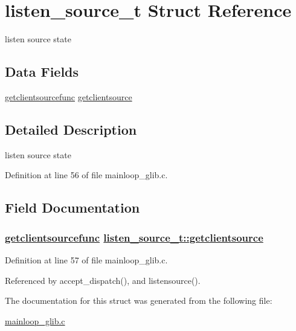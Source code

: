 \hypertarget{structlisten__source__t}{
\section{listen\_\-source\_\-t Struct Reference}
\label{structlisten__source__t}
}
listen source state  


\subsection*{Data Fields}
\begin{CompactItemize}
\item 
\hyperlink{mainloop__glib_8c_a16}{getclientsourcefunc} \hyperlink{structlisten__source__t_o0}{getclientsource}
\end{CompactItemize}


\subsection{Detailed Description}
listen source state 



Definition at line 56 of file mainloop\_\-glib.c.

\subsection{Field Documentation}
\hypertarget{structlisten__source__t_o0}{
\subsubsection[getclientsource]{\setlength{\rightskip}{0pt plus 5cm}\hyperlink{mainloop__glib_8c_a16}{getclientsourcefunc} \hyperlink{structlisten__source__t_o0}{listen\_\-source\_\-t::getclientsource}}}
\label{structlisten__source__t_o0}




Definition at line 57 of file mainloop\_\-glib.c.

Referenced by accept\_\-dispatch(), and listensource().

The documentation for this struct was generated from the following file:\begin{CompactItemize}
\item 
\hyperlink{mainloop__glib_8c}{mainloop\_\-glib.c}\end{CompactItemize}
